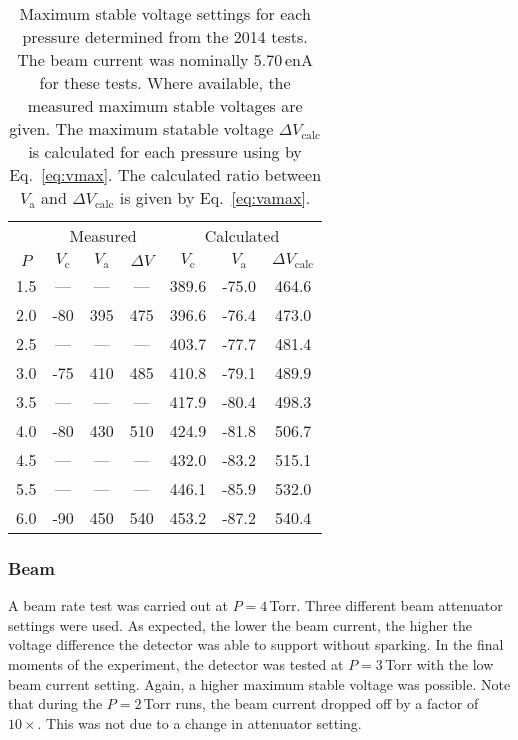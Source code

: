 \begin{table}[!ht]
\centering
\begin{tabular}{cccc|ccc}
\hline
& \multicolumn{3}{c|}{Measured}  %
& \multicolumn{3}{c}{Calculated} \\ \cline{2-7} 
$P$& $V_\textrm{c}$ & $V_\textrm{a}$ & $\Delta V$ & $V_\textrm{c}$ & $V_\textrm{a}$ &$\Delta V_\textrm{calc}$ \\
\hline \hline
1.5 & --- &--- & --- & 389.6 & -75.0 & 464.6\\
2.0 & -80 &395 & 475 & 396.6 & -76.4 & 473.0\\
2.5 & --- &--- & --- & 403.7 & -77.7 & 481.4\\
3.0 & -75 &410 & 485 & 410.8 & -79.1 & 489.9\\
3.5 & --- &--- & --- & 417.9 & -80.4 & 498.3\\
4.0 & -80 &430 & 510 & 424.9 & -81.8 & 506.7\\
4.5 & --- &--- & --- & 432.0 & -83.2 & 515.1\\
5.5 & --- &--- & --- & 446.1 & -85.9 & 532.0\\
6.0 & -90 &450 & 540 & 453.2 & -87.2 & 540.4\\
\hline
\end{tabular}
\caption{Maximum stable voltage settings for each pressure determined from the 2014 tests. The beam current was nominally 5.70\,enA for these tests. Where available, the measured maximum stable voltages are given. The maximum statable voltage $\Delta V_\textrm{calc}$ %
is %
 calculated for %
 each pressure using by Eq.~\ref{eq:vmax}.  The calculated ratio between $V_\textrm{a}$  and $\Delta V_\textrm{calc}$ is given by Eq.~\ref{eq:vamax}.}
\label{max_V}
\end{table}
\subsubsection{Beam}
A beam rate test was carried out at $P=4$\,Torr. Three different beam attenuator settings were used. As expected, the lower the beam current, the higher the voltage difference the detector was able to support without sparking. In the final moments of the experiment, the detector was tested at $P=3$\,Torr with the low beam current setting. Again, a higher maximum stable voltage was possible. Note that during the $P=2$\,Torr runs, the beam current dropped off by a factor of $10\times$. This was not due to a change in attenuator setting.
